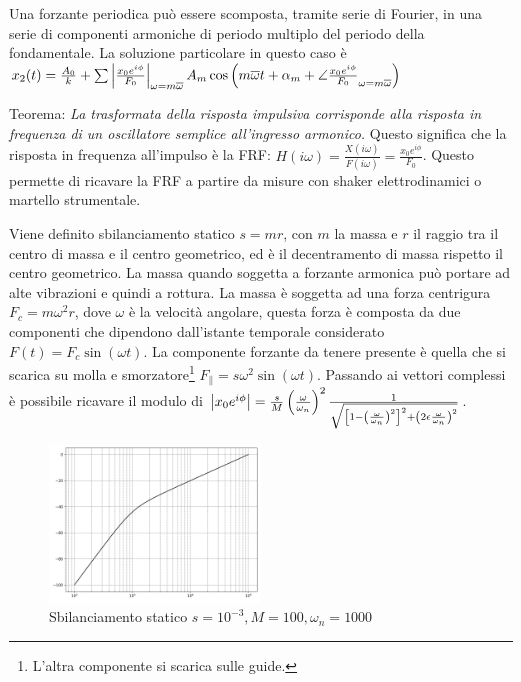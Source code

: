 
Una forzante periodica può essere scomposta, tramite serie di Fourier, in una serie di componenti armoniche di periodo multiplo del periodo della fondamentale. La soluzione particolare in questo caso è \(x_2(t) = \frac{A_0}{k} + \sum \left|\frac{x_0 e^{i\phi}}{F_0}\right|_{\omega=m\overline{\omega}} A_m \cos{\left( m\overline{\omega} t + \alpha_m + \angle{\frac{x_0 e^{i\phi}}{F_0}}_{\omega=m\overline{\omega}} \right)}\)

Teorema: \textit{La trasformata della risposta impulsiva corrisponde alla risposta in frequenza di un oscillatore semplice all'ingresso armonico.}
Questo significa che la risposta in frequenza all'impulso è la FRF: \(H(i\omega) = \frac{X(i\omega)}{F(i\omega)} = \frac{x_0 e^{i\phi}}{F_0}\).
Questo permette di ricavare la FRF a partire da misure con shaker elettrodinamici o martello strumentale.


Viene definito sbilanciamento statico \( s=mr \), con \(m\) la massa e \(r\) il raggio tra il centro di massa e il centro geometrico, ed è il decentramento di massa rispetto il centro geometrico. La massa quando soggetta a forzante armonica può portare ad alte vibrazioni e quindi a rottura.
La massa è soggetta ad una forza centrigura \(F_c = m\omega^2 r\), dove \(\omega\) è la velocità angolare, questa forza è composta da due componenti che dipendono dall'istante temporale considerato \(F(t)=F_c \sin{(\omega t)}\).
La componente forzante da tenere presente è quella che si scarica su molla e smorzatore\footnote{L'altra componente si scarica sulle guide.} \( F_\parallel = s\omega^2 \sin{(\omega t)} \).
Passando ai vettori complessi è possibile ricavare il modulo di \(\left|x_0 e^{i\phi}\right| = \frac{s}{M}\left(\frac{\omega}{\omega_n}\right)^2 \frac{1}{\sqrt{\left[ 1-\left( \frac{\omega}{\omega_n} \right)^2  \right]^2 + \left( 2\epsilon \frac{\omega}{\omega_n} \right)^2}}\).

\begin{figure}[h]
    \centering
    \includegraphics[width=0.5\textwidth]{Immagini/sbilanciamento_statico.png}
    \caption{Sbilanciamento statico \(s=10^{-3}, M=100, \omega_n=1000\)}
\end{figure}

